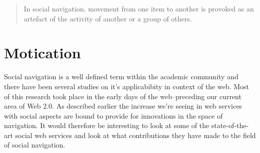\begin{quote}
In social navigation, movement from one item to another is provoked as an
artefact of the activity of another or a group of others. \citep{dourish94} 
\end{quote}

\section{Motication}

Social navigation is a well defined term within the academic
community and there have been several studies on it's applicabibity in context
of the web. Most of this research took place in the early days of the
web--preceding our current area of Web 2.0. As described earlier the
increase we're seeing in web services with social aspects are bound to provide
for innovations in the space of navigation. It would therefore be interesting
to look at some of the state-of-the-art social web services and look at what
contributions they have made to the field of social navigation.





%
%
%
